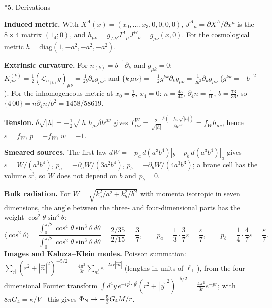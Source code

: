 \documentclass[10pt,a4paper]{article}
\makeatletter
\renewcommand\section{\@startsection{section}{1}{\z@}{-3.5ex \@plus -1ex \@minus -.2ex}{2.3ex \@plus.2ex}{\normalfont\Large\bfseries\raggedright}}
\makeatother
\begin{document}
\section*{5. Derivations}
\textbf{Induced metric.} With $X^A(x)=(x_0,\dots,x_3,0,0,0,0)$, $J^A{}_\mu=\partial X^A/\partial x^\mu$ is the $8\times4$ matrix $(1_4;0)$, and $h_{\mu\nu}=g_{AB}J^A{}_\mu J^B{}_\nu=g_{\mu\nu}(x,0)$. For the cosmological metric $h=\mathrm{diag}(1,-a^2,-a^2,-a^2)$.

\textbf{Extrinsic curvature.} For $n_{(k)}=b^{-1}\partial_k$ and $g_{\mu k}=0$: $K^{(k)}_{\mu\nu}=\frac12(\mathcal L_{n_{(k)}}g)_{\mu\nu}=\frac1{2b}\partial_kg_{\mu\nu}$; and $\{k\,\mu\nu\}=-\frac12g^{kk}\partial_kg_{\mu\nu}=\frac1{2b^2}\partial_kg_{\mu\nu}$ ($g^{kk}=-b^{-2}$). For the inhomogeneous metric at $x_0=\frac12$, $x_4=0$: $n=\frac{45}{44}$, $\partial_4n=\frac1{10}$, $b=\frac{73}{36}$, so $\{4\,00\}=n\partial_4n/b^2=1458/58619$.

\textbf{Tension.} $\delta\sqrt{|h|}=-\frac12\sqrt{|h|}h_{\mu\nu}\delta h^{\mu\nu}$ gives $T^W_{\mu\nu}=\frac2{\sqrt{|h|}}\frac{\delta(-f_W\sqrt{|h|})}{\delta h^{\mu\nu}}=f_Wh_{\mu\nu}$, hence $\varepsilon=f_W$, $p=-f_W$, $w=-1$.

\textbf{Smeared sources.} The first law $dW=-p_a\,d(a^3b^4)|_b-p_b\,d(a^3b^4)|_a$ gives $\varepsilon=W/(a^3b^4)$, $p_a=-\partial_aW/(3a^2b^4)$, $p_b=-\partial_bW/(4a^3b^3)$; a brane cell has the volume $a^3$, so $W$ does not depend on $b$ and $p_b=0$.

\textbf{Bulk radiation.} For $W=\sqrt{k_a^2/a^2+k_b^2/b^2}$ with momenta isotropic in seven dimensions, the angle between the three- and four-dimensional parts has the weight $\cos^2\theta\sin^3\theta$:
\begin{equation*}
\langle\cos^2\theta\rangle=\frac{\int_0^{\pi/2}\cos^4\theta\sin^3\theta\,d\theta}{\int_0^{\pi/2}\cos^2\theta\sin^3\theta\,d\theta}=\frac{2/35}{2/15}=\frac37,\qquad p_a=\frac13\cdot\frac37\varepsilon=\frac\varepsilon7,\qquad p_b=\frac14\cdot\frac47\varepsilon=\frac\varepsilon7 .
\end{equation*}
\textbf{Images and Kaluza–Klein modes.} Poisson summation: $\sum_{\vec n}(r^2+|\vec n|^2)^{-5/2}=\frac{4\pi^2}{3r}\sum_{\vec m}e^{-2\pi r|\vec m|}$ (lengths in units of $\ell_\perp$), from the four-dimensional Fourier transform $\int d^4y\,e^{-i\vec p\cdot\vec y}(r^2+|\vec y|^2)^{-5/2}=\frac{4\pi^2}{3r}e^{-pr}$; with $8\pi G_4=\kappa/V_\perp$ this gives $\Phi_{\rm N}\to-\frac53G_4M/r$.
\end{document}
